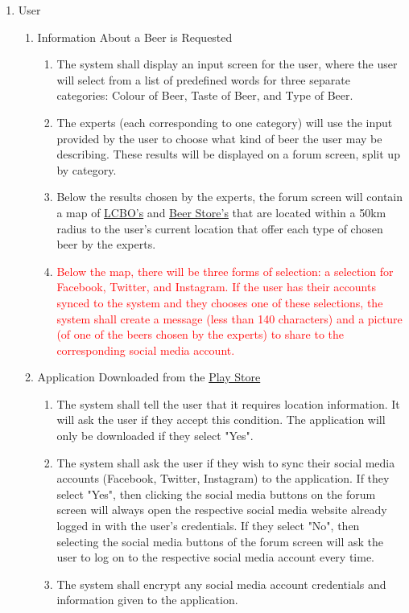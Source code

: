 \documentclass[]{article}
\begin{document}
\begin{enumerate}[{VP}1.]
	\item User
	
	\begin{enumerate}[{BE1}.1]
		\item Information About a Beer is Requested
		\begin{enumerate}
			\item The system shall display an input screen for the user, where the user will select from a list of predefined words for three separate categories: Colour of Beer, Taste of Beer, and Type of Beer.
			\item The experts (each corresponding to one category) will use the input provided by the user to choose what kind of beer the user may be describing. These results will be displayed on a forum screen, split up by category.
			\item Below the results chosen by the experts, the forum screen will contain a map of \underline{LCBO's} and \underline{Beer Store's} that are located within a 50km radius to the user's current location that offer each type of chosen beer by the experts.
			\item \textcolor{red}{Below the map, there will be three forms of selection: a selection for Facebook, Twitter, and Instagram. If the user has their accounts synced to the system and they chooses one of these selections, the system shall create a message (less than 140 characters) and a picture (of one of the beers chosen by the experts) to share to the corresponding social media account.}
		\end{enumerate}
		
		\item Application Downloaded from the \underline{Play Store}
		\begin{enumerate}
			\item The system shall tell the user that it requires location information. It will ask the user if they accept this condition. The application will only be downloaded if they select "Yes".
			\item The system shall ask the user if they wish to sync their social media accounts (Facebook, Twitter, Instagram) to the application. If they select "Yes", then clicking the social media buttons on the forum screen will always open the respective social media website already logged in with the user's credentials. If they select "No", then selecting the social media buttons of the forum screen will ask the user to log on to the respective social media account every time.
			\item The system shall encrypt any social media account credentials and information given to the application. 
		\end{enumerate}
		

\end{enumerate}
\end{enumerate}
\end{document}

